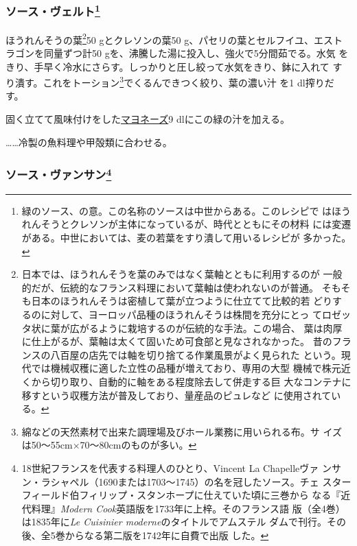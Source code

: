 \begin{recette}
\hypertarget{sauce-verte}{%
\subsubsection[ソース・ヴェルト]{\texorpdfstring{ソース・ヴェルト\footnote{緑のソース、の意。この名称のソースは中世からある。このレシピで
  はほうれんそうとクレソンが主体になっているが、時代とともにその材料
  には変遷がある。中世においては、麦の若葉をすり潰して用いるレシピが
  多かった。}}{ソース・ヴェルト}}\label{sauce-verte}}



ほうれんそうの葉\footnote{日本では、ほうれんそうを葉のみではなく葉軸とともに利用するのが
  一般的だが、伝統的なフランス料理において葉軸は使われないのが普通。
  そもそも日本のほうれんそうは密植して葉が立つように仕立てて比較的若
  どりするのに対して、ヨーロッパ品種のほうれんそうは株間を充分にとっ
  てロゼッタ状に葉が広がるように栽培するのが伝統的な手法。この場合、
  葉は肉厚に仕上がるが、葉軸は太くて固いため可食部と見なされなかった。
  昔のフランスの八百屋の店先では軸を切り捨てる作業風景がよく見られた
  という。現代では機械収穫に適した立性の品種が増えており、専用の大型
  機械で株元近くから切り取り、自動的に軸をある程度除去して併走する巨
  大なコンテナに移すという収穫方法が普及しており、量産品のピュレなど
  に使用されている。}50 gとクレソンの葉50
g、パセリの葉とセルフイユ、エスト ラゴンを同量ずつ計50
gを、沸騰した湯に投入し、強火で5分間茹でる。水気
をきり、手早く冷水にさらす。しっかりと圧し絞って水気をきり、鉢に入れて
すり潰す。これをトーション\footnote{綿などの天然素材で出来た調理場及びホール業務に用いられる布。サ
  イズは50〜55cm×70〜80cmのものが多い。}でくるんできつく絞り、葉の濃い汁
を1 dl搾りだす。

固く立てて風味付けをした\protect\hyperlink{mayonnaise}{マヨネーズ}9
dlにこの緑の汁を加える。

\ldots{}\ldots{}冷製の魚料理や甲殻類に合わせる。

\hypertarget{sauce-vincent}{%
\subsubsection[ソース・ヴァンサン]{\texorpdfstring{ソース・ヴァンサン\footnote{18世紀フランスを代表する料理人のひとり、Vincent
  La Chapelleヴァ
  ンサン・ラシャペル（1690または1703〜1745）の名を冠したソース。チェ
  スターフィールド伯フィリップ・スタンホープに仕えていた頃に三巻から
  なる『近代料理』\emph{Modern Cook}英語版を1733年に上梓。そのフランス語
  版（全4巻）は1835年に\emph{Le Cuisinier moderne}のタイトルでアムステル
  ダムで刊行。その後、全5巻からなる第二版を1742年に自費で出版 した。}}{ソース・ヴァンサン}}\label{sauce-vincent}}


\end{recette}

